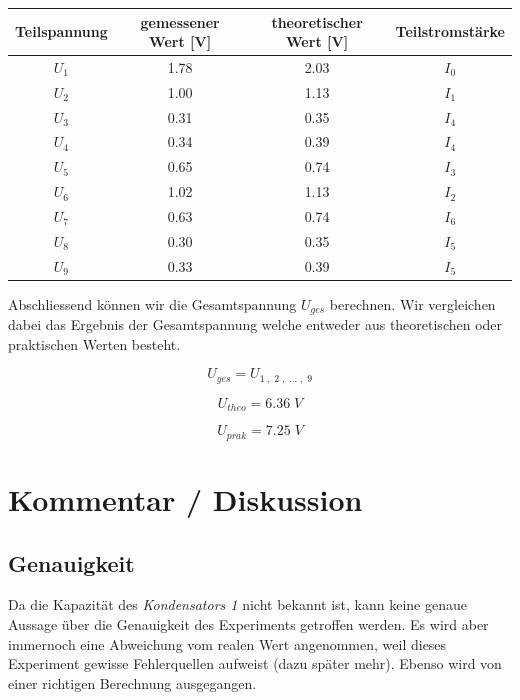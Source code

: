\documentclass[a4paper,12pt]{article}
\begin{document}
\begin{table}[H]
\centering
    \begin{tabular}{|c|c|c|c|}
        \hline
        \textbf{Teilspannung} & \textbf{gemessener Wert [V]} & \textbf{theoretischer Wert [V]} & \textbf{Teilstromstärke}\\
        \hline
        $U_1$ & 1.78 & 2.03 & $I_0$\\
        \hline
        $U_2$ & 1.00 & 1.13 & $I_1$\\
        \hline
        $U_3$ & 0.31 & 0.35 & $I_4$\\
        \hline
        $U_4$ & 0.34 & 0.39 & $I_4$\\
        \hline
        $U_5$ & 0.65 & 0.74 & $I_3$\\
        \hline
        $U_6$ & 1.02 & 1.13 & $I_2$\\
        \hline
        $U_7$ & 0.63 & 0.74 & $I_6$\\
        \hline
        $U_8$ & 0.30 & 0.35 & $I_5$\\
        \hline
        $U_9$ & 0.33 & 0.39 & $I_5$\\
        \hline
    \end{tabular}
\end{table}

Abschliessend können wir die Gesamtspannung $U_{ges}$ berechnen. Wir vergleichen dabei das Ergebnis der Gesamtspannung welche entweder aus theoretischen oder praktischen Werten besteht.

$$U_{ges} = U_{1\;,\;2\;,\; ...\;,\; 9}$$

$$U_{theo} = 6.36\; V$$

$$U_{prak} = 7.25\; V$$

\section{Kommentar / Diskussion}

\subsection{Genauigkeit}

Da die Kapazität des \textit{Kondensators 1} nicht bekannt ist, kann keine genaue Aussage über die Genauigkeit des Experiments getroffen werden. Es wird aber immernoch eine Abweichung vom realen Wert angenommen, weil dieses Experiment gewisse Fehlerquellen aufweist (dazu später mehr). Ebenso wird von einer richtigen Berechnung ausgegangen.\\
\end{document}
